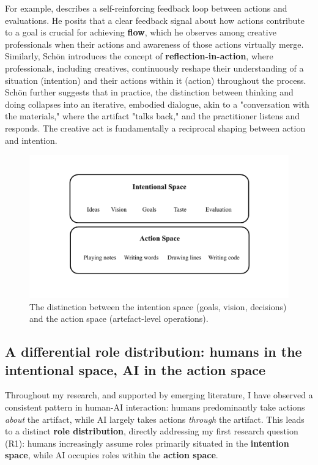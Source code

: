 For example, \cite{Csikszentmihalyi1997-ui} describes a self-reinforcing feedback loop between actions and evaluations. He posits that a clear feedback signal about how actions contribute to a goal is crucial for achieving \textbf{flow}, which he observes among creative professionals when their actions and awareness of those actions virtually merge. Similarly, Schön \cite{Schon1987-fy} introduces the concept of \textbf{reflection-in-action}, where professionals, including creatives, continuously reshape their understanding of a situation (intention) and their actions within it (action) throughout the process. Schön \cite{Schon1992-jt} further suggests that in practice, the distinction between thinking and doing collapses into an iterative, embodied dialogue, akin to a "conversation with the materials," where the artifact "talks back," and the practitioner listens and responds. The creative act is fundamentally a reciprocal shaping between action and intention.

\begin{figure}[H]
 \centering
\includegraphics[width=1\linewidth]{intention action spaces.png}
 \caption{The distinction between the intention space (goals, vision, decisions) and the action space (artefact-level operations).}
 \label{fig:intention-action-spaces}
\end{figure}

\subsection{A differential role distribution: humans in the intentional space, AI in the action space}

Throughout my research, and supported by emerging literature, I have observed a consistent pattern in human-AI interaction: humans predominantly take actions \textit{about} the artifact, while AI largely takes actions \textit{through} the artifact. This leads to a distinct \textbf{role distribution}, directly addressing my first research question (R1): humans increasingly assume roles primarily situated in the \textbf{intention space}, while AI occupies roles within the \textbf{action space}.

